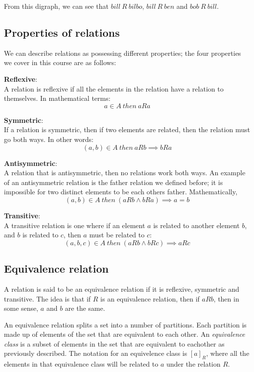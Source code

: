 From this digraph, we can see that $bill~R~bilbo$, $bill~R~ben$ and
$bob~R~bill$.

\subsection{Properties of relations}

We can describe relations as possessing different properties; the four properties
we cover in this course are as follows:

\begin{description}
	\item {\bf Reflexive}:\\
		A relation is reflexive if all the elements in the relation have a
		relation to themselves. In mathematical terms:
		\[
			a \in A~then~aRa
		\]
	\item {\bf Symmetric}:\\
		If a relation is symmetric, then if two elements are related, then the
		relation must go both ways. In other words:
		\[
			(a,b) \in A~then~aRb \implies bRa
		\]
	\item {\bf Antisymmetric}:\\
		A relation that is antisymmetric, then no relations work both ways. An
		example of an antisymmetric relation is the father relation we defined
		before; it is impossible for two distinct elements to be each others
		father. Mathematically, 
		\[
			(a,b) \in A~then~(aRb \wedge bRa) \implies a=b
		\]
	\item {\bf Transitive}:\\
		A transitive relation is one where if an element $a$ is related to
		another element $b$, and $b$ is related to $c$, then $a$ must be related
		to $c$:
		\[
			(a,b,c) \in A~then~(aRb \wedge bRc) \implies aRc
		\]
\end{description}

\subsection{Equivalence relation}

A relation is said to be an equivalence relation if it is reflexive, symmetric
and transitive. The idea is that if $R$ is an equivalence relation, then if
$aRb$, then in some sense, $a$ and $b$ are the same.

An equivalence relation splits a set into a number of partitions. Each partition
is made up of elements of the set that are equivalent to each other. An {\it
equivalence class} is a subset of elements in the set that are equivalent to
eachother as previously described. The notation for an equivelence class is
$[a]_R$, where all the elements in that equivalence class will be related to
$a$ under the relation $R$.

